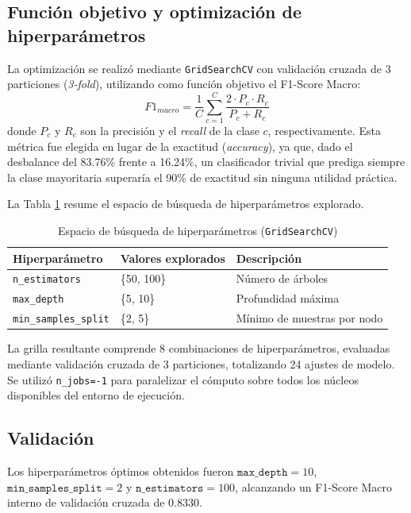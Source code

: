\subsection{Función objetivo y optimización de hiperparámetros}
La optimización se realizó mediante \texttt{GridSearchCV} con validación cruzada de 3 particiones (\emph{3-fold}), utilizando como función objetivo el F1-Score Macro:
\begin{equation}
F1_{macro} = \frac{1}{C} \sum_{c=1}^{C} \frac{2 \cdot P_c \cdot R_c}{P_c + R_c}
\label{eq:f1macro}
\end{equation}
donde $P_c$ y $R_c$ son la precisión y el \emph{recall} de la clase $c$, respectivamente. Esta métrica fue elegida en lugar de la exactitud (\emph{accuracy}), ya que, dado el desbalance del 83.76\% frente a 16.24\%, un clasificador trivial que prediga siempre la clase mayoritaria superaría el 90\% de exactitud sin ninguna utilidad práctica.
 
La Tabla \ref{tab:grid} resume el espacio de búsqueda de hiperparámetros explorado.
 
\begin{table}[H]
\centering
\caption{Espacio de búsqueda de hiperparámetros (\texttt{GridSearchCV})}
\label{tab:grid}
\begin{tabular}{lll}
\toprule
\textbf{Hiperparámetro} & \textbf{Valores explorados} & \textbf{Descripción} \\
\midrule
\texttt{n\_estimators} & \{50, 100\} & Número de árboles \\
\texttt{max\_depth} & \{5, 10\} & Profundidad máxima \\
\texttt{min\_samples\_split} & \{2, 5\} & Mínimo de muestras por nodo \\
\bottomrule
\end{tabular}
\end{table}
 
La grilla resultante comprende 8 combinaciones de hiperparámetros, evaluadas mediante validación cruzada de 3 particiones, totalizando 24 ajustes de modelo. Se utilizó \texttt{n\_jobs=-1} para paralelizar el cómputo sobre todos los núcleos disponibles del entorno de ejecución.
 
\subsection{Validación}
Los hiperparámetros óptimos obtenidos fueron $\texttt{max\_depth}=10$, $\texttt{min\_samples\_split}=2$ y $\texttt{n\_estimators}=100$, alcanzando un F1-Score Macro interno de validación cruzada de $0.8330$.